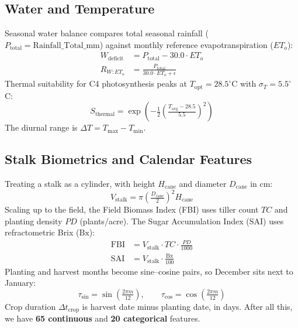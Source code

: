 \documentclass[conference,10pt,letterpaper]{IEEEtran}
\begin{document}
\subsection{Water and Temperature}
Seasonal water balance compares total seasonal rainfall ($P_{\text{total}} = \text{Rainfall\_Total\_mm}$) against monthly reference evapotranspiration ($ET_o$):
\begin{align}
W_{\text{deficit}} &= P_{\text{total}} - 30.0 \cdot ET_o \\
R_{W:ET_o} &= \frac{P_{\text{total}}}{30.0 \cdot ET_o + \epsilon}
\end{align}
Thermal suitability for C4 photosynthesis peaks at $T_{\text{opt}} = 28.5^\circ$C with $\sigma_T = 5.5^\circ$C:
\begin{equation}
S_{\text{thermal}} = \exp\!\left(-\tfrac{1}{2}\left(\tfrac{T_{\text{avg}} - 28.5}{5.5}\right)^2\right)
\end{equation}
The diurnal range is $\Delta T = T_{\max} - T_{\min}$.

\subsection{Stalk Biometrics and Calendar Features}
Treating a stalk as a cylinder, with height $H_{\text{cane}}$ and diameter $D_{\text{cane}}$ in cm:
\begin{equation}
V_{\text{stalk}} = \pi \left(\tfrac{D_{\text{cane}}}{2}\right)^2 H_{\text{cane}}
\end{equation}
Scaling up to the field, the Field Biomass Index (FBI) uses tiller count $TC$ and planting density $PD$ (plants/acre). The Sugar Accumulation Index (SAI) uses refractometric Brix ($\text{Bx}$):
\begin{align}
\text{FBI} &= V_{\text{stalk}} \cdot TC \cdot \tfrac{PD}{1000} \\
\text{SAI} &= V_{\text{stalk}} \cdot \tfrac{\text{Bx}}{100}
\end{align}
Planting and harvest months become sine--cosine pairs, so December sits next to January:
\begin{equation}
\tau_{\sin} = \sin\!\left(\tfrac{2\pi m}{12}\right), \qquad
\tau_{\cos} = \cos\!\left(\tfrac{2\pi m}{12}\right)
\end{equation}
Crop duration $\Delta t_{\text{crop}}$ is harvest date minus planting date, in days. After all this, we have \textbf{65 continuous} and \textbf{20 categorical} features.

\end{document}
